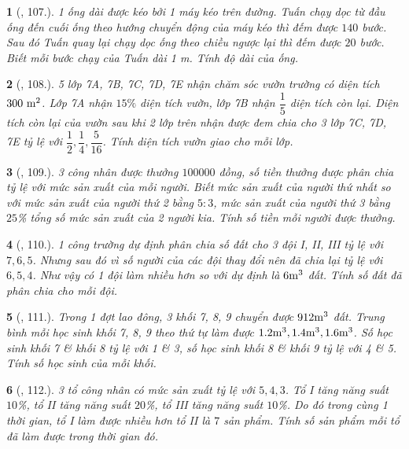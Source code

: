 \documentclass{article}
\newtheorem{baitoan}{}
\begin{document}
\begin{baitoan}[\cite{Binh_Toan_7_tap_1}, 107.]
	1 ống dài được kéo bởi 1 máy kéo trên đường. Tuấn chạy dọc từ đầu ống đến cuối ống theo hướng chuyển động của máy kéo thì đếm được $140$ bước. Sau đó Tuấn quay lại chạy dọc ống theo chiều ngược lại thì đếm được $20$ bước. Biết mỗi bước chạy của Tuấn dài {\rm1 m}. Tính độ dài của ống.
\end{baitoan}

\begin{baitoan}[\cite{Binh_Toan_7_tap_1}, 108.]
	5 lớp 7A, 7B, 7C, 7D, 7E nhận chăm sóc vườn trường có diện tích $\rm300\ m^2$. Lớp 7A nhận $15\%$ diện tích vườn, lớp 7B nhận $\dfrac{1}{5}$ diện tích còn lại. Diện tích còn lại của vườn sau khi 2 lớp trên nhận được đem chia cho 3 lớp 7C, 7D, 7E tỷ lệ với $\dfrac{1}{2},\dfrac{1}{4},\dfrac{5}{16}$. Tính diện tích vườn giao cho mỗi lớp.
\end{baitoan}

\begin{baitoan}[\cite{Binh_Toan_7_tap_1}, 109.]
	3 công nhân được thưởng $100000$ đồng, số tiền thưởng được phân chia tỷ lệ với mức sản xuất của mỗi người. Biết mức sản xuất của người thứ nhất so với mức sản xuất của người thứ 2 bằng $5:3$, mức sản xuất của người thứ 3 bằng $25$\% tổng số mức sản xuất của 2 người kia. Tính số tiền mỗi người được thưởng.
\end{baitoan}

\begin{baitoan}[\cite{Binh_Toan_7_tap_1}, 110.]
	1 công trường dự định phân chia số đất cho 3 đội I, II, III tỷ lệ với $7,6,5$. Nhưng sau đó vì số người của các đội thay đổi nên đã chia lại tỷ lệ với $6,5,4$. Như vậy có 1 đội làm nhiều hơn so với dự định là $\rm6m^3$ đất. Tính số đất đã phân chia cho mỗi đội.
\end{baitoan}

\begin{baitoan}[\cite{Binh_Toan_7_tap_1}, 111.]
	Trong 1 đợt lao đông, 3 khối 7, 8, 9 chuyển được $\rm912m^3$ đất. Trung bình mỗi học sinh khối 7, 8, 9 theo thứ tự làm được $\rm1.2m^3,1.4m^3,1.6m^3$. Số học sinh khối 7 \& khối 8 tỷ lệ với 1 \& 3, số học sinh khối 8 \& khối 9 tỷ lệ với 4 \& 5. Tính số học sinh của mỗi khối.
\end{baitoan}

\begin{baitoan}[\cite{Binh_Toan_7_tap_1}, 112.]
	3 tổ công nhân có mức sản xuất tỷ lệ với $5,4,3$. Tổ I tăng năng suất $10$\%, tổ II tăng năng suất $20$\%, tổ III tăng năng suất $10$\%. Do đó trong cùng 1 thời gian, tổ I làm được nhiều hơn tổ II là $7$ sản phẩm. Tính số sản phẩm mỗi tổ đã làm được trong thời gian đó.
\end{baitoan}
\end{document}

